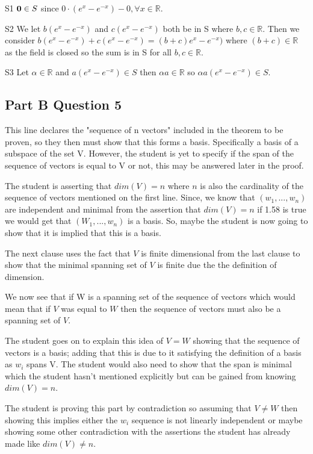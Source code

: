 \documentclass{article}
\begin{document}
S1 $\bold{0} \in S $ since $0 \cdot (e^x - e^{-x}) - 0, \forall x \in \mathbb{R}$.

S2 We let $b(e^x - e^{-x})$ and $c(e^x - e^{-x})$ both be in S where $b,c \in \mathbb{R}$. Then we consider $b(e^x - e^{-x}) + c(e^x - e^{-x}) = (b+c)e^x - e^{-x})$ where $(b+c) \in \mathbb{R}$ as the field is closed so the sum is in S for all $b,c \in \mathbb{R}$.

S3 Let $\alpha \in \mathbb{R}$ and $a (e^x - e^{-x}) \in S$ then $\alpha a \in \mathbb{R}$ so $\alpha a (e^x - e^{-x}) \in S$.




\subsection{Part B Question 5 }
This line declares the "sequence of n vectors" included in the theorem to be proven, so they then must show that this forms a basis. Specifically a basis of a subspace of the set V. However, the student is yet to specify if the span of the sequence of vectors is equal to V or not, this may be answered later in the proof.

The student is asserting that $dim(V) = n$ where $n$ is also the cardinality of the sequence of vectors mentioned on the first line. Since, we know that $(w_1,...,w_n)$ are independent and minimal from the assertion that $dim(V) = n$ if 1.58 is true we would get that $(W_1,...,w_n)$ is a basis. So, maybe the student is now going to show that it is implied that this is a basis.

The next clause uses the fact that $V$ is finite dimensional from the last clause to show that the minimal spanning set of $V$ is finite due the the definition of dimension.

We now see that if W is a spanning set of the sequence of vectors which would mean that if $V$ was equal to $W$ then the sequence of vectors must also be a spanning set of $V$.

The student goes on to explain this idea of $V=W$ showing that the sequence of vectors is a basis; adding that this is due to it satisfying the definition of a basis as $w_i$ spans V. The student would also need to show that the span is minimal which the student hasn't mentioned explicitly but can be gained from knowing $dim(V) = n$.

The student is proving this part by contradiction so assuming that $V \neq W$ then showing this implies either the $w_i$ sequence is not linearly independent or maybe showing some other contradiction with the assertions the student has already made like $dim(V) \neq n$.
\end{document}
